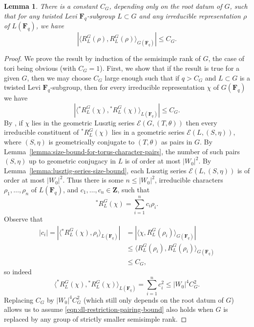 \documentclass[11pt,reqno]{amsart}
\newtheorem{lemma}[theorem]{Lemma}
\theoremstyle{definition}
\newcommand{\F}{{\mathbf F}}
\newcommand{\Z}{{\mathbf Z}}
\newcommand{\cE}{\mathcal{E}}
\begin{document}
\begin{lemma}\label{lemma:mackey-formula-bound}
    There is a constant $C_G$, depending only on the root datum of $G$, such that for any twisted Levi $\F_q$-subgroup $L \subset G$ and any irreducible representation $\rho$ of $L(\F_q)$, we have
    \[
    |\langle R_L^G(\rho), R_L^G(\rho)\rangle_{G(\F_q)}| \leq C_G.
    \]
\end{lemma}

\begin{proof}
    We prove the result by induction of the semisimple rank of $G$, the case of tori being obvious (with $C_G = 1$). First, we show that if the result is true for a given $G$, then we may choose $C_G$ large enough such that if $q > C_G$ and $L \subset G$ is a twisted Levi $\F_q$-subgroup, then for every irreducible representation $\chi$ of $G(\F_q)$ we have
    \begin{equation}\label{eqn:dl-restriction-pairing-bound}
    |\langle {}^*R^G_L(\chi), {}^*R^G_L(\chi)\rangle_{L(\F_q)}| \leq C_G.
    \end{equation}
    By \cite[Corollaire 11.11]{Bon06}, if $\chi$ lies in the geometric Lusztig series $\cE(G, (T, \theta))$ then every irreducible constituent of ${}^*R^G_L(\chi)$ lies in a geometric series $\cE(L, (S,\eta))$, where $(S, \eta)$ is geometrically conjugate to $(T, \theta)$ as pairs in $G$. By Lemma~\ref{lemma:size-bound-for-torus-character-pairs}, the number of such pairs $(S, \eta)$ up to geometric conjugacy in $L$ is of order at most $|W_0|^2$. By Lemma~\ref{lemma:lusztig-series-size-bound}, each Lusztig series $\cE(L, (S,\eta))$ is of order at most $|W_0|^2$. Thus there is some $n \leq |W_0|^2$, irreducible characters $\rho_1, \dots, \rho_n$ of $L(\F_q)$, and $c_1, \dots, c_n \in \Z$, such that
    \[
    ^*R^G_L(\chi) = \sum_{i=1}^n c_i\rho_i.
    \]
    Observe that
    \begin{align*}
    |c_i| =|\langle {}^*R^G_L(\chi), \rho_i\rangle_{L(\F_q)}| &= |\langle \chi, R_L^G(\rho_i)\rangle_{G(\F_q)}| \\
        &\leq \langle R_L^G(\rho_i), R_L^G(\rho_i)\rangle_{G(\F_q)} \\
        &\leq C_G,
    \end{align*}
    so indeed
    \[
    \langle ^*R^G_L(\chi), {}^*R^G_L(\chi)\rangle_{L(\F_q)} = \sum_{i=1}^n c_i^2 \leq |W_0|^4 C_G^2.
    \]
    Replacing $C_G$ by $|W_0|^4 C_G^2$ (which still only depends on the root datum of $G$) allows us to assume \eqref{eqn:dl-restriction-pairing-bound} also holds when $G$ is replaced by any group of strictly smaller semisimple rank.
    

\end{proof}
\end{document}
